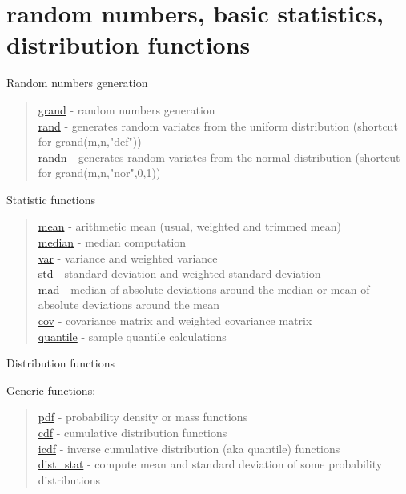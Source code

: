 \chapter*{random numbers, basic statistics, distribution functions}

Random numbers generation

\begin{quote}
\noindent
\hyperlink{grand}{grand} - random numbers generation\\
\hyperlink{rand}{rand} - generates random variates from the uniform distribution (shortcut for grand(m,n,"def"))\\
\hyperlink{randn}{randn} - generates random variates from the normal distribution (shortcut for grand(m,n,"nor",0,1))
\end{quote}

Statistic functions

\begin{quote}
\noindent
\hyperlink{mean}{mean} - arithmetic mean (usual, weighted and trimmed mean)\\
\hyperlink{median}{median} - median computation\\
\hyperlink{var}{var} - variance and weighted variance\\
\hyperlink{std}{std} - standard deviation and weighted standard deviation\\
\hyperlink{mad}{mad} - median of absolute deviations around the median or mean of absolute deviations around the mean\\
\hyperlink{cov}{cov} - covariance matrix and weighted covariance matrix\\
\hyperlink{quantile}{quantile} - sample quantile calculations\\
\end{quote}



Distribution functions

Generic functions: 
\begin{quote}
\noindent
\hyperlink{pdf}{pdf} - probability density or mass functions \\
\hyperlink{cdf}{cdf} - cumulative distribution functions \\
\hyperlink{icdf}{icdf} - inverse cumulative distribution (aka quantile) functions \\
\hyperlink{dist_stat}{dist\_stat} - compute mean and standard deviation of some probability distributions \\
\end{quote}

